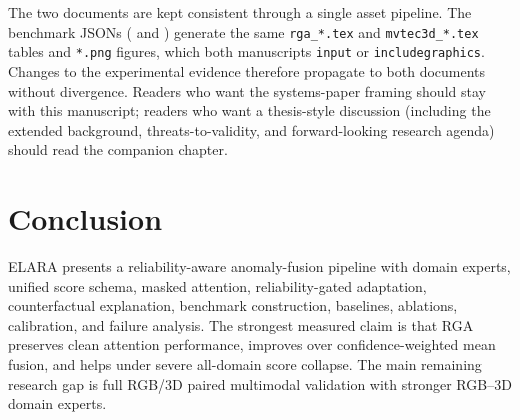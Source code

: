 \documentclass[10pt,conference]{IEEEtran}
\newcommand{\system}{ELARA}
\newcommand{\method}{RGA}
\begin{document}
The two documents are kept consistent through a single asset pipeline. The
benchmark JSONs ( and
) generate the same
\texttt{rga\_*.tex} and \texttt{mvtec3d\_*.tex} tables and \texttt{*.png}
figures, which both manuscripts \texttt{input} or \texttt{includegraphics}.
Changes to the experimental evidence therefore propagate to both documents
without divergence. Readers who want the systems-paper framing should stay
with this manuscript; readers who want a thesis-style discussion (including
the extended background, threats-to-validity, and forward-looking research
agenda) should read the companion chapter.

\section{Conclusion}
\system{} presents a reliability-aware anomaly-fusion pipeline with domain
experts, unified score schema, masked attention, reliability-gated adaptation,
counterfactual explanation, benchmark construction, baselines, ablations,
calibration, and failure analysis. The strongest measured claim is that
\method{} preserves clean attention performance, improves over
confidence-weighted mean fusion, and helps under severe all-domain score
collapse. The main remaining research gap is full RGB/3D paired multimodal
validation with stronger RGB--3D domain experts.
\end{document}
